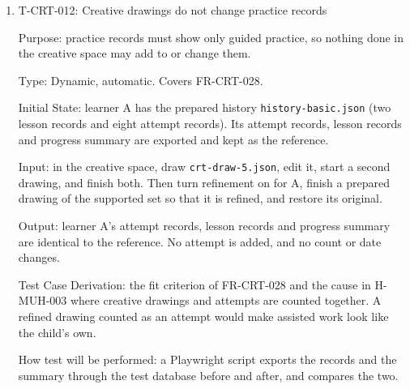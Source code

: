 \documentclass[12pt, titlepage]{article}
\newcommand{\testitem}[1]{\item #1\par\nopagebreak}
\begin{document}
\begin{enumerate}
Test Case Derivation: the fit criteria of FR-CRT-025 (changes made while
offline are saved once the connection returns) and FR-CRT-029 (unsaved, then
saved). Case (b) tries to make Squigglr save the same change twice or skip
one, as in the retried saves of H-MUH-004 and H-MUH-005. Case (d) is the
Document/Test control of H-MUH-005 for cause (c), closing the page during and
after a lost connection. Offline use is out of scope (SRS ASM-005), so
FR-CRT-025 cannot require changes to survive a closed page. The case
therefore only requires that the indicator was truthful (FR-CRT-029) and
records which changes are kept, as the Hazard Analysis asks.

How test will be performed: a Playwright script switches the network with
\texttt{context.setOffline()}, records the indicator after each step, and
reads the saved drawing through the test database. In (d) it closes the page
and opens a new one in the same browser context. A tester repeats (a) on
the test iPad by turning off Wi-Fi.

\testitem{T-CRT-012: Creative drawings do not change practice records}

Purpose: practice records must show only guided practice, so nothing done in
the creative space may add to or change them.

Type: Dynamic, automatic. Covers FR-CRT-028.

Initial State: learner A has the prepared history \texttt{history-basic.json}
(two lesson records and eight attempt records). Its attempt records, lesson
records and progress summary are exported and kept as the reference.

Input: in the creative space, draw \texttt{crt-draw-5.json}, edit it, start a
second drawing, and finish both. Then turn refinement on for A, finish a
prepared drawing of the supported set so that it is refined, and restore its
original.

Output: learner A's attempt records, lesson records and progress summary are
identical to the reference. No attempt is added, and no count or date
changes.

Test Case Derivation: the fit criterion of FR-CRT-028 and the cause in
H-MUH-003 where creative drawings and attempts are counted together. A
refined drawing counted as an attempt would make assisted work look like the
child's own.

How test will be performed: a Playwright script exports the records and the
summary through the test database before and after, and compares the two.

\end{enumerate}
\end{document}
